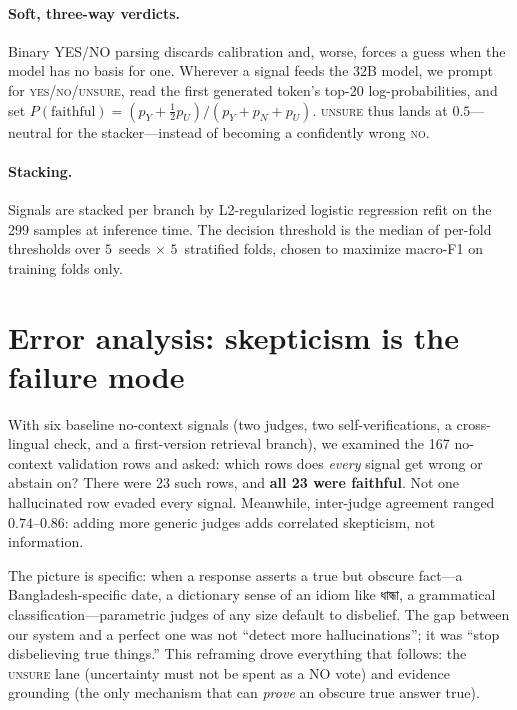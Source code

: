 \documentclass[11pt]{article}
\newcommand{\bn}[1]{{\bengalifont #1}}
\begin{document}
\paragraph{Soft, three-way verdicts.}
Binary YES/NO parsing discards calibration and, worse, forces a guess when the
model has no basis for one. Wherever a signal feeds the 32B model, we prompt
for \textsc{yes}/\textsc{no}/\textsc{unsure}, read the first generated token's
top-20 log-probabilities, and set
$P(\text{faithful}) = (p_Y + \tfrac{1}{2}p_U)/(p_Y + p_N + p_U)$.
\textsc{unsure} thus lands at $0.5$---neutral for the stacker---instead of
becoming a confidently wrong \textsc{no}.

\paragraph{Stacking.}
Signals are stacked per branch by L2-regularized logistic regression refit on
the 299 samples at inference time. The decision threshold is the median of
per-fold thresholds over $5$~seeds $\times$ $5$~stratified folds, chosen to
maximize macro-F1 on training folds only.

\section{Error analysis: skepticism is the failure mode}
\label{sec:analysis}

With six baseline no-context signals (two judges, two self-verifications,
a cross-lingual check, and a first-version retrieval branch), we examined the
167 no-context validation rows and asked: which rows does \emph{every} signal
get wrong or abstain on? There were 23 such rows, and \textbf{all 23 were
faithful}. Not one hallucinated row evaded every signal. Meanwhile,
inter-judge agreement ranged $0.74$--$0.86$: adding more generic judges adds
correlated skepticism, not information.

The picture is specific: when a response asserts a true but obscure fact---a
Bangladesh-specific date, a dictionary sense of an idiom like
\bn{ধান্ধা}, a grammatical classification---parametric judges of any size
default to disbelief. The gap between our system and a perfect one was not
``detect more hallucinations''; it was ``stop disbelieving true things.''
This reframing drove everything that follows: the \textsc{unsure} lane
(uncertainty must not be spent as a NO vote) and evidence grounding (the only
mechanism that can \emph{prove} an obscure true answer true).
\end{document}
